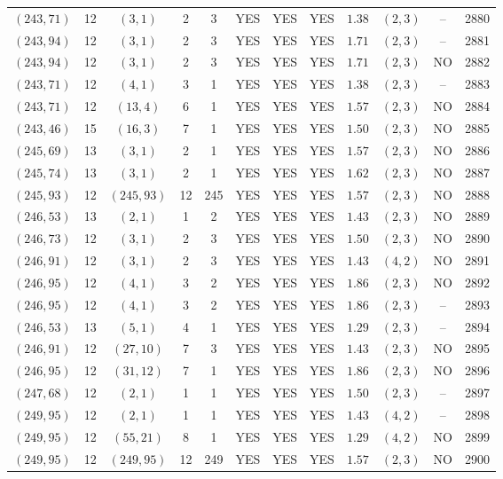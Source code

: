 \begin{longtable}{|c|c|c|c|c|c|c|c|c|c|c|c|}
$(243,71)$ & 12 & $(3,1)$ & 2 & 3 & YES & YES & YES & $1.38$ & $(2,3)$ & -- & 2880\\
$(243,94)$ & 12 & $(3,1)$ & 2 & 3 & YES & YES & YES & $1.71$ & $(2,3)$ & -- & 2881\\
$(243,94)$ & 12 & $(3,1)$ & 2 & 3 & YES & YES & YES & $1.71$ & $(2,3)$ & NO & 2882\\
$(243,71)$ & 12 & $(4,1)$ & 3 & 1 & YES & YES & YES & $1.38$ & $(2,3)$ & -- & 2883\\
$(243,71)$ & 12 & $(13,4)$ & 6 & 1 & YES & YES & YES & $1.57$ & $(2,3)$ & NO & 2884\\
$(243,46)$ & 15 & $(16,3)$ & 7 & 1 & YES & YES & YES & $1.50$ & $(2,3)$ & NO & 2885\\
$(245,69)$ & 13 & $(3,1)$ & 2 & 1 & YES & YES & YES & $1.57$ & $(2,3)$ & NO & 2886\\
$(245,74)$ & 13 & $(3,1)$ & 2 & 1 & YES & YES & YES & $1.62$ & $(2,3)$ & NO & 2887\\
$(245,93)$ & 12 & $(245,93)$ & 12 & 245 & YES & YES & YES & $1.57$ & $(2,3)$ & NO & 2888\\
$(246,53)$ & 13 & $(2,1)$ & 1 & 2 & YES & YES & YES & $1.43$ & $(2,3)$ & NO & 2889\\
$(246,73)$ & 12 & $(3,1)$ & 2 & 3 & YES & YES & YES & $1.50$ & $(2,3)$ & NO & 2890\\
$(246,91)$ & 12 & $(3,1)$ & 2 & 3 & YES & YES & YES & $1.43$ & $(4,2)$ & NO & 2891\\
$(246,95)$ & 12 & $(4,1)$ & 3 & 2 & YES & YES & YES & $1.86$ & $(2,3)$ & NO & 2892\\
$(246,95)$ & 12 & $(4,1)$ & 3 & 2 & YES & YES & YES & $1.86$ & $(2,3)$ & -- & 2893\\
$(246,53)$ & 13 & $(5,1)$ & 4 & 1 & YES & YES & YES & $1.29$ & $(2,3)$ & -- & 2894\\
$(246,91)$ & 12 & $(27,10)$ & 7 & 3 & YES & YES & YES & $1.43$ & $(2,3)$ & NO & 2895\\
$(246,95)$ & 12 & $(31,12)$ & 7 & 1 & YES & YES & YES & $1.86$ & $(2,3)$ & NO & 2896\\
$(247,68)$ & 12 & $(2,1)$ & 1 & 1 & YES & YES & YES & $1.50$ & $(2,3)$ & -- & 2897\\
$(249,95)$ & 12 & $(2,1)$ & 1 & 1 & YES & YES & YES & $1.43$ & $(4,2)$ & -- & 2898\\
$(249,95)$ & 12 & $(55,21)$ & 8 & 1 & YES & YES & YES & $1.29$ & $(4,2)$ & NO & 2899\\
$(249,95)$ & 12 & $(249,95)$ & 12 & 249 & YES & YES & YES & $1.57$ & $(2,3)$ & NO & 2900\\

\end{longtable}
